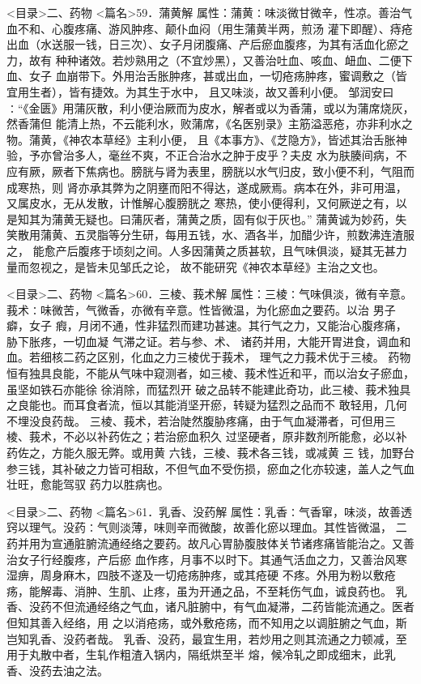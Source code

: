 \documentclass[a4paper,12pt,UTF8,twoside]{ctexbook}
\begin{document}
<目录>二、药物
<篇名>59．蒲黄解
属性：蒲黄∶味淡微甘微辛，性凉。善治气血不和、心腹疼痛、游风肿疼、颠仆血闷（用生蒲黄半两，煎汤 
灌下即醒）、痔疮出血（水送服一钱，日三次）、女子月闭腹痛、产后瘀血腹疼，为其有活血化瘀之力，故有 
种种诸效。若炒熟用之（不宜炒黑），又善治吐血、咳血、衄血、二便下血、女子 
血崩带下。外用治舌胀肿疼，甚或出血，一切疮疡肿疼，蜜调敷之（皆宜用生者），皆有捷效。为其生于水中， 
且又味淡，故又善利小便。 
邹润安曰∶“《金匮》用蒲灰散，利小便治厥而为皮水，解者或以为香蒲，或以为蒲席烧灰，然香蒲但 
能清上热，不云能利水，败蒲席，《名医别录》主筋溢恶疮，亦非利水之物。蒲黄，《神农本草经》主利小便， 
且《本事方》、《芝隐方》，皆述其治舌胀神验，予亦曾治多人，毫丝不爽，不正合治水之肿于皮乎？夫皮 
水为肤腠间病，不应有厥，厥者下焦病也。膀胱与肾为表里，膀胱以水气归皮，致小便不利，气阻而成寒热，则 
肾亦承其弊为之阴壅而阳不得达，遂成厥焉。病本在外，非可用温，又属皮水，无从发散，计惟解心腹膀胱之 
寒热，使小便得利，又何厥逆之有，以是知其为蒲黄无疑也。曰蒲灰者，蒲黄之质，固有似于灰也。” 
蒲黄诚为妙药，失笑散用蒲黄、五灵脂等分生研，每用五钱，水、酒各半，加醋少许，煎数沸连渣服之， 
能愈产后腹疼于顷刻之间。人多因蒲黄之质甚软，且气味俱淡，疑其无甚力量而忽视之，是皆未见邹氏之论， 
故不能研究《神农本草经》主治之文也。 

<目录>二、药物
<篇名>60．三棱、莪术解
属性：三棱∶气味俱淡，微有辛意。莪术∶味微苦，气微香，亦微有辛意。性皆微温，为化瘀血之要药。以治 
男子 癖，女子 瘕，月闭不通，性非猛烈而建功甚速。其行气之力，又能治心腹疼痛，胁下胀疼，一切血凝 
气滞之证。若与参、术、 诸药并用，大能开胃进食，调血和血。若细核二药之区别，化血之力三棱优于莪术， 
理气之力莪术优于三棱。 
药物恒有独具良能，不能从气味中窥测者，如三棱、莪术性近和平，而以治女子瘀血，虽坚如铁石亦能徐 
徐消除，而猛烈开 
破之品转不能建此奇功，此三棱、莪术独具之良能也。而耳食者流，恒以其能消坚开瘀，转疑为猛烈之品而不 
敢轻用，几何不埋没良药哉。 
三棱、莪术，若治陡然腹胁疼痛，由于气血凝滞者，可但用三棱、莪术，不必以补药佐之；若治瘀血积久 
过坚硬者，原非数剂所能愈，必以补药佐之，方能久服无弊。或用黄 六钱，三棱、莪术各三钱，或减黄 三 
钱，加野台参三钱，其补破之力皆可相敌，不但气血不受伤损，瘀血之化亦较速，盖人之气血壮旺，愈能驾驭 
药力以胜病也。 

<目录>二、药物
<篇名>61．乳香、没药解
属性：乳香∶气香窜，味淡，故善透窍以理气。没药∶气则淡薄，味则辛而微酸，故善化瘀以理血。其性皆微温， 
二药并用为宣通脏腑流通经络之要药。故凡心胃胁腹肢体关节诸疼痛皆能治之。又善治女子行经腹疼，产后瘀 
血作疼，月事不以时下。其通气活血之力，又善治风寒湿痹，周身麻木，四肢不遂及一切疮疡肿疼，或其疮硬 
不疼。外用为粉以敷疮疡，能解毒、消肿、生肌、止疼，虽为开通之品，不至耗伤气血，诚良药也。 
乳香、没药不但流通经络之气血，诸凡脏腑中，有气血凝滞，二药皆能流通之。医者但知其善入经络，用 
之以消疮疡，或外敷疮疡，而不知用之以调脏腑之气血，斯岂知乳香、没药者哉。 
乳香、没药，最宜生用，若炒用之则其流通之力顿减，至用于丸散中者，生轧作粗渣入锅内，隔纸烘至半 
熔，候冷轧之即成细末，此乳香、没药去油之法。 
\end{document}
